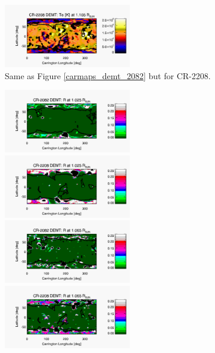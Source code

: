 \documentclass[namedreferences]{solarphysics}
\begin{document}
\begin{article}
\begin{figure}[h!]
\begin{center}
\includegraphics[width=0.495\textwidth]{figs/map_Tm_CR2208_DEMT-AIA_H1_L522_r3d_1105_Rsun.pdf}
\caption{Same as Figure \ref{carmaps_demt_2082} but for CR-2208.}
\label{carmaps_demt_2208}
\end{center}
\end{figure}

\begin{figure}[h!]
\begin{center}
\includegraphics[width=0.495\textwidth]{figs/map_R_CR2082_DEMT-EUVI_behind_H1-L3523_r3d_1025_Rsun.pdf}
\includegraphics[width=0.495\textwidth]{figs/map_R_CR2208_DEMT-AIA_H1_L522_r3d_1025_Rsun.pdf}
\includegraphics[width=0.495\textwidth]{figs/map_R_CR2082_DEMT-EUVI_behind_H1-L3523_r3d_1065_Rsun.pdf}
\includegraphics[width=0.495\textwidth]{figs/map_R_CR2208_DEMT-AIA_H1_L522_r3d_1065_Rsun.pdf}

\end{center}
\end{figure}
\end{article}
\end{document}
